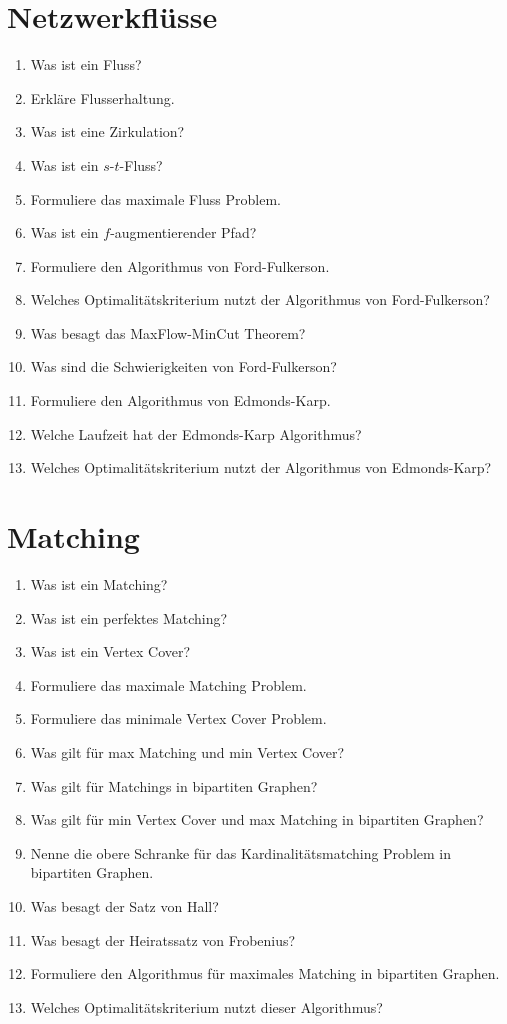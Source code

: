 \documentclass[a4paper,10pt]{scrreprt}
\begin{document}
	\section{Netzwerkflüsse}
	\begin{enumerate}
		\item Was ist ein Fluss?
		\item Erkläre Flusserhaltung.
		\item Was ist eine Zirkulation?
		\item Was ist ein $s$-$t$-Fluss?
		\item Formuliere das maximale Fluss Problem.
		\item Was ist ein $f$-augmentierender Pfad?
		\item Formuliere den Algorithmus von Ford-Fulkerson.
		\item Welches Optimalitätskriterium nutzt der Algorithmus von Ford-Fulkerson?
		\item Was besagt das MaxFlow-MinCut Theorem?
		\item Was sind die Schwierigkeiten von Ford-Fulkerson?
		\item Formuliere den Algorithmus von Edmonds-Karp.
		\item Welche Laufzeit hat der Edmonds-Karp Algorithmus?
		\item Welches Optimalitätskriterium nutzt der Algorithmus von Edmonds-Karp?
	\end{enumerate}
	\section{Matching}
	\begin{enumerate}
		\item Was ist ein Matching?
		\item Was ist ein perfektes Matching?
		\item Was ist ein Vertex Cover?
		\item Formuliere das maximale Matching Problem.
		\item Formuliere das minimale Vertex Cover Problem.
		\item Was gilt für max Matching und min Vertex Cover?
		\item Was gilt für Matchings in bipartiten Graphen?
		\item Was gilt für min Vertex Cover und max Matching in bipartiten Graphen?
		\item Nenne die obere Schranke für das Kardinalitätsmatching Problem in bipartiten Graphen.
		\item Was besagt der Satz von Hall?
		\item Was besagt der Heiratssatz von Frobenius?
		\item Formuliere den Algorithmus für maximales Matching in bipartiten Graphen.
		\item Welches Optimalitätskriterium nutzt dieser Algorithmus?
	\end{enumerate}	
\end{document}
